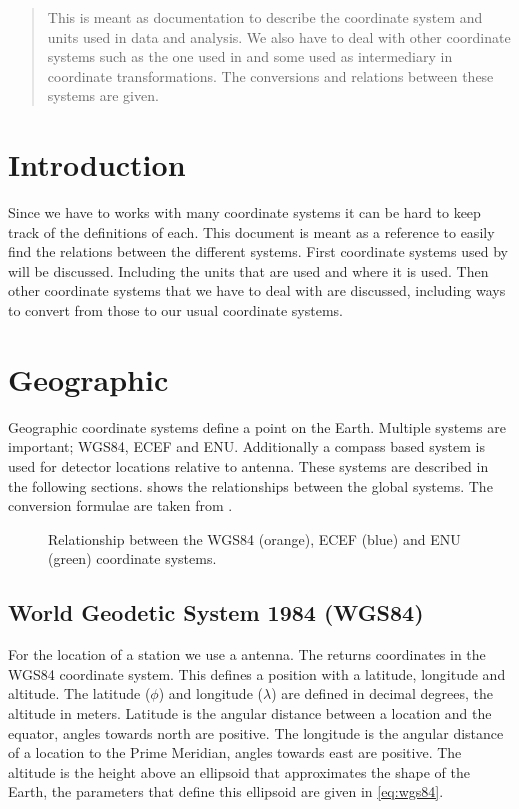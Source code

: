 \begin{abstract}

This is meant as documentation to describe the coordinate system and
units used in \hisparc data and analysis. We also have to deal with
other coordinate systems such as the one used in \corsika and some used
as intermediary in coordinate transformations. The conversions and
relations between these systems are given.

\end{abstract}


\section{Introduction}

Since we have to works with many coordinate systems it can be hard to
keep track of the definitions of each. This document is meant as a
reference to easily find the relations between the different systems.
First coordinate systems used by \hisparc will be discussed. Including
the units that are used and where it is used. Then other coordinate
systems that we have to deal with are discussed, including ways to
convert from those to our usual coordinate systems.


\section{Geographic}

Geographic coordinate systems define a point on the Earth. Multiple
systems are important; WGS84, ECEF and ENU. Additionally a compass based
system is used for detector locations relative to \gps antenna. These
systems are described in the following sections.
 shows the relationships between the global
systems. The conversion formulae are taken from \cite{wikigeodetic}.

\begin{figure}
    \centering
    
    \caption{Relationship between the WGS84 (orange), ECEF (blue) and ENU
             (green) coordinate systems.}
    \label{fig:wgs84_ecef_enu}
\end{figure}


\subsection{World Geodetic System 1984 (WGS84)}

For the location of a station we use a \gps antenna. The \gps returns
coordinates in the WGS84 coordinate system. This defines a position with
a latitude, longitude and altitude. The latitude ($\phi$) and longitude
($\lambda$) are defined in decimal degrees, the altitude in meters.
Latitude is the angular distance between a location and the equator,
angles towards north are positive. The longitude is the angular distance
of a location to the Prime Meridian, angles towards east are positive.
The altitude is the height above an ellipsoid that approximates the
shape of the Earth, the parameters that define this ellipsoid are given
in \eqref{eq:wgs84}.


